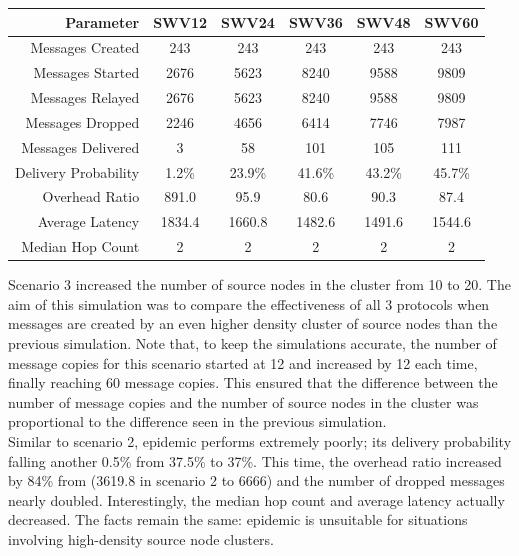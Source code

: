 \documentclass{article}
\begin{document}
\begin{center}
\begin{tabular}{|r|c|c|c|c|c|}
\hline
\textbf{Parameter} & \textbf{SWV12} & \textbf{SWV24} & \textbf{SWV36} & \textbf{SWV48} & \textbf{SWV60} \\ \hline
Messages Created & 243 & 243 & 243 & 243 & 243 \\ \hline
Messages Started & 2676 & 5623 & 8240 & 9588 & 9809 \\ \hline
Messages Relayed & 2676 & 5623 & 8240 & 9588 & 9809 \\ \hline
Messages Dropped & 2246 & 4656 & 6414 & 7746 & 7987 \\ \hline
Messages Delivered & 3 & 58 & 101 & 105 & 111 \\ \hline
Delivery Probability & 1.2\% & 23.9\% & 41.6\% & 43.2\% & 45.7\% \\ \hline
Overhead Ratio & 891.0 & 95.9 & 80.6 & 90.3 & 87.4 \\ \hline
Average Latency & 1834.4 & 1660.8 & 1482.6 & 1491.6 & 1544.6 \\ \hline
Median Hop Count & 2 & 2 & 2 & 2 & 2 \\ \hline
\end{tabular}
\end{center}

\vspace{16px}
\noindent Scenario 3 increased the number of source nodes in the cluster from 10 to 20. The aim of this simulation was to compare the effectiveness of all 3 protocols when messages are created by an even higher density cluster of source nodes than the previous simulation. Note that, to keep the simulations accurate, the number of message copies for this scenario started at 12 and increased by 12 each time, finally reaching 60 message copies. This ensured that the difference between the number of message copies and the number of source nodes in the cluster was proportional to the difference seen in the previous simulation.\\
\newline Similar to scenario 2, epidemic performs extremely poorly; its delivery probability falling another 0.5\% from 37.5\% to 37\%. This time, the overhead ratio increased by 84\% from (3619.8 in scenario 2 to 6666) and the number of dropped messages nearly doubled. Interestingly, the median hop count and average latency actually decreased. The facts remain the same: epidemic is unsuitable for situations involving high-density source node clusters.\\
\newline 
\end{document}
